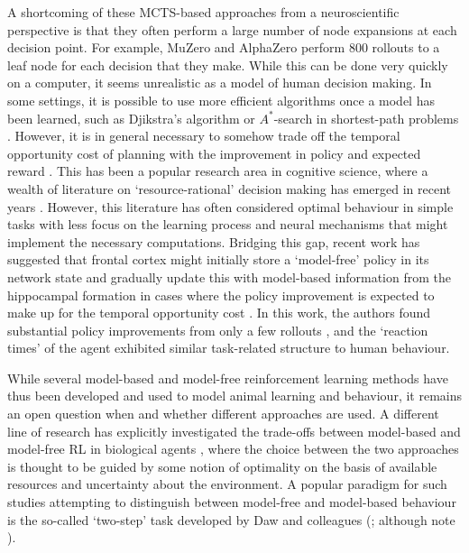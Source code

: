

A shortcoming of these MCTS-based approaches from a neuroscientific perspective is that they often perform a large number of node expansions at each decision point.
For example, MuZero and AlphaZero perform 800 rollouts to a leaf node for each decision that they make.
While this can be done very quickly on a computer, it seems unrealistic as a model of human decision making.
In some settings, it is possible to use more efficient algorithms once a model has been learned, such as Djikstra's algorithm or $A^*$-search in shortest-path problems \citep{hart1968formal}.
However, it is in general necessary to somehow trade off the temporal opportunity cost of planning with the improvement in policy and expected reward \citep{botvinick2014computational,agrawal2022temporal}.
This has been a popular research area in cognitive science, where a wealth of literature on `resource-rational' decision making has emerged in recent years \citep{griffiths2019doing,callaway2022rational}.
However, this literature has often considered optimal behaviour in simple tasks with less focus on the learning process and neural mechanisms that might implement the necessary computations.
Bridging this gap, recent work has suggested that frontal cortex might initially store a `model-free' policy in its network state and gradually update this with model-based information from the hippocampal formation in cases where the policy improvement is expected to make up for the temporal opportunity cost \citep{jensen2023recurrent}.
In this work, the authors found substantial policy improvements from only a few rollouts \citep{vul2014one}, and the `reaction times' of the agent exhibited similar task-related structure to human behaviour.

While several model-based and model-free reinforcement learning methods have thus been developed and used to model animal learning and behaviour, it remains an open question when and whether different approaches are used.
A different line of research has explicitly investigated the trade-offs between model-based and model-free RL in biological agents \citep{daw2005uncertainty, geerts2020general, lengyel2007hippocampal}, where the choice between the two approaches is thought to be guided by some notion of optimality on the basis of available resources and uncertainty about the environment.
A popular paradigm for such studies attempting to distinguish between model-free and model-based behaviour is the so-called `two-step' task developed by Daw and colleagues (\citealp{daw2011model,momennejad2017successor,wang2018prefrontal}; although note \citealp{akam2015simple}).

